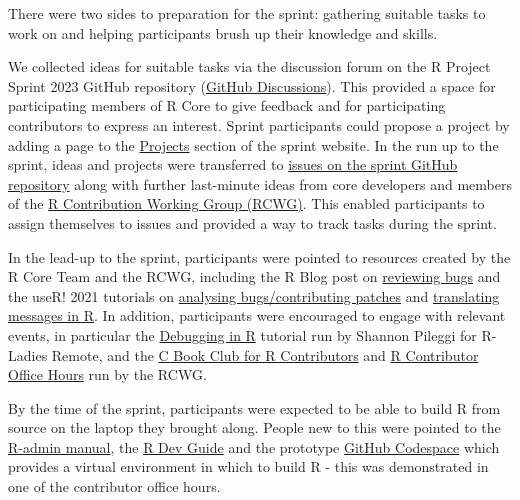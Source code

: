 There were two sides to preparation for the sprint: gathering suitable tasks to
work on and helping participants brush up their knowledge and skills.

We collected ideas for suitable tasks via the discussion forum on the R Project Sprint 2023 GitHub
repository (\href{https://github.com/r-devel/r-project-sprint-2023/discussions/categories/ideas}{GitHub Discussions}).
This provided a space for participating members of R Core to give
feedback and for participating contributors to express an interest. Sprint
participants could propose a project by adding a page to the \href{https://contributor.r-project.org/r-project-sprint-2023/projects/}{Projects}
section of the sprint website. In the run up to the sprint, ideas and projects
were transferred to \href{https://github.com/r-devel/r-project-sprint-2023/issues}{issues on the sprint GitHub repository}
along with further last-minute ideas from core developers and members of the \href{https://contributor.r-project.org/working-group}{R Contribution Working Group (RCWG)}. This enabled participants to assign themselves to
issues and provided a way to track tasks during the sprint.

In the lead-up to the sprint, participants were
pointed to resources created by the R Core Team and the RCWG,
including the R Blog post on \href{https://blog.r-project.org/2019/10/09/r-can-use-your-help-reviewing-bug-reports/index.html}{reviewing bugs} and
the useR! 2021 tutorials on \href{https://contributor.r-project.org/tutorials/contributing-to-r/}{analysing bugs/contributing patches} and
\href{https://contributor.r-project.org/tutorials/translating-r-to-your-language/}{translating messages in R}. In addition, participants were encouraged to engage with relevant events,
in particular the \href{https://youtu.be/179x00KGd9M}{Debugging in R} tutorial run
by Shannon Pileggi for R-Ladies Remote, and the \href{https://contributor.r-project.org/events/c-book-club-2023/}{C Book Club for R Contributors} and
\href{https://contributor.r-project.org/events/office-hours/}{R Contributor Office Hours}
run by the RCWG.

By the time of the sprint, participants were expected to be able to build R
from source on the laptop they brought along. People new to this were
pointed to the \href{https://cran.r-project.org/doc/manuals/r-devel/R-admin.html}{R-admin manual},
the \href{https://contributor.r-project.org/rdevguide/}{R Dev Guide} and the
prototype \href{https://github.com/r-devel/r-dev-env/}{GitHub Codespace} which
provides a virtual environment in which to build R - this was demonstrated in
one of the contributor office hours.

